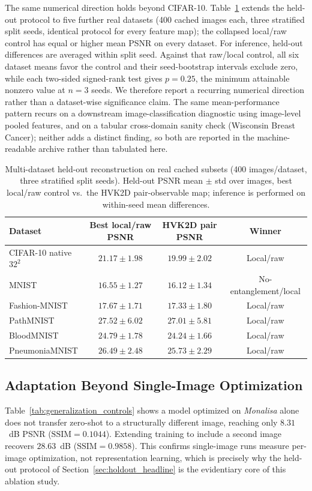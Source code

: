 \documentclass[11pt]{article}
\begin{document}
The same numerical direction holds beyond CIFAR-10. Table~\ref{tab:multi_dataset_reconstruction} extends the held-out protocol to five further real datasets (400 cached images each, three stratified split seeds, identical protocol for every feature map); the collapsed local/raw control has equal or higher mean PSNR on every dataset. For inference, held-out differences are averaged within split seed. Against that raw/local control, all six dataset means favor the control and their seed-bootstrap intervals exclude zero, while each two-sided signed-rank test gives $p=0.25$, the minimum attainable nonzero value at $n=3$ seeds. We therefore report a recurring numerical direction rather than a dataset-wise significance claim. The same mean-performance pattern recurs on a downstream image-classification diagnostic using image-level pooled features, and on a tabular cross-domain sanity check (Wisconsin Breast Cancer); neither adds a distinct finding, so both are reported in the machine-readable archive rather than tabulated here.

\begin{table}[H]
\centering
\caption{Multi-dataset held-out reconstruction on real cached subsets (400 images/dataset, three stratified split seeds). Held-out PSNR mean $\pm$ std over images, best local/raw control vs.\ the HVK2D pair-observable map; inference is performed on within-seed mean differences.}
\label{tab:multi_dataset_reconstruction}
\scriptsize
\begin{tabular}{lccc}
\toprule
Dataset & Best local/raw PSNR & HVK2D pair PSNR & Winner \\
\midrule
CIFAR-10 native $32^2$ & $21.17{\pm}1.98$ & $19.99{\pm}2.02$ & Local/raw \\
MNIST & $16.55{\pm}1.27$ & $16.12{\pm}1.34$ & No-entanglement/local \\
Fashion-MNIST & $17.67{\pm}1.71$ & $17.33{\pm}1.80$ & Local/raw \\
PathMNIST & $27.52{\pm}6.02$ & $27.01{\pm}5.81$ & Local/raw \\
BloodMNIST & $24.79{\pm}1.78$ & $24.24{\pm}1.66$ & Local/raw \\
PneumoniaMNIST & $26.49{\pm}2.48$ & $25.73{\pm}2.29$ & Local/raw \\
\bottomrule
\end{tabular}
\end{table}

\subsection{Adaptation Beyond Single-Image Optimization}
Table~\ref{tab:generalization_controls} shows a model optimized on \textit{Monalisa} alone does not transfer zero-shot to a structurally different image, reaching only $8.31$~dB PSNR ($\mathrm{SSIM}=0.1044$). Extending training to include a second image recovers $28.63$~dB ($\mathrm{SSIM}=0.9858$). This confirms single-image runs measure per-image optimization, not representation learning, which is precisely why the held-out protocol of Section~\ref{sec:holdout_headline} is the evidentiary core of this ablation study.
\end{document}
